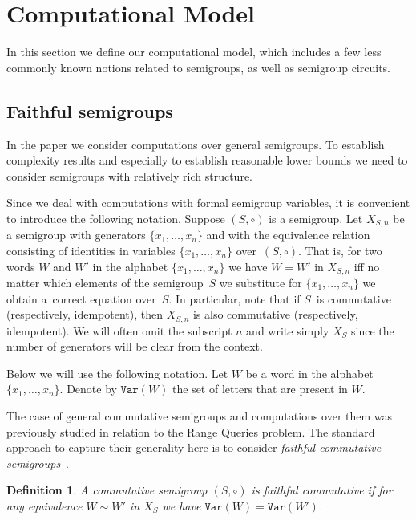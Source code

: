 \documentclass[11pt,letterpaper]{article}
\newtheorem{definition}{Definition}
\newcommand{\var}{\texttt{Var}}
\begin{document}
\section{Computational Model}

In this section we define our computational model, which includes a few less
commonly known notions related to semigroups, as well as semigroup circuits.

\subsection{Faithful semigroups}

In the paper we consider computations over general semigroups. To establish
complexity results and especially to establish reasonable lower bounds we need
to consider semigroups with relatively rich structure.

Since we deal with computations with formal semigroup variables, it is
convenient to introduce the following notation. Suppose $(S, \circ)$ is a
semigroup. Let $X_{S,n}$ be a semigroup with generators $\{x_1,\ldots, x_n\}$
and with the equivalence relation consisting of identities in variables
$\{x_1,\ldots, x_n\}$ over~$(S,\circ)$. That is, for two words $W$ and $W'$ in
the alphabet $\{x_1,\ldots,x_n\}$ we have $W=W'$ in $X_{S,n}$ iff no matter which
elements of the semigroup~$S$ we substitute for $\{x_1,\ldots, x_n\}$ we obtain
a~correct equation over~$S$. In particular, note that if $S$~is commutative
(respectively, idempotent), then $X_{S,n}$ is also commutative (respectively,
idempotent). We will often omit the subscript $n$ and write simply $X_S$ since the number of generators will be clear from the context.

Below we will use the following notation. Let $W$ be a word in the alphabet
$\{x_1,\ldots, x_n\}$. Denote by $\var(W)$ the set of letters that are present
in $W$.

The case of general commutative semigroups and computations over them was
previously studied in relation to the Range Queries problem. The standard
approach to capture their generality here is to consider \emph{faithful
commutative semigroups}~\cite{DBLP:conf/stoc/Yao82,DBLP:journals/ijcga/ChazelleR91}.

\begin{definition}
A commutative semigroup $(S, \circ)$ is \emph{faithful commutative} if for any
equivalence $W\sim W'$ in $X_S$ we have $\var(W)=\var(W')$.
\end{definition}
\end{document}
